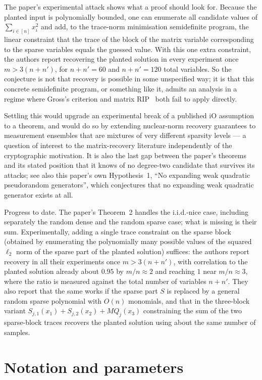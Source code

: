 \documentclass{aicr-conjecture}
\newcommand{\MQ}{\mathit{MQ}}
\begin{document}
The paper's experimental attack shows what a proof should look for.
Because the planted input is polynomially bounded, one can enumerate
all candidate values of $\sum_{i \in [n]} x_i^2$ and add, to the
trace-norm minimisation semidefinite program, the linear constraint
that the trace of the block of the matrix variable corresponding to the
sparse variables equals the guessed value. With this one extra
constraint, the authors report recovering the planted solution in every
experiment once $m > 3(n + n')$, for $n + n' = 60$ and $n + n' = 120$
total variables. So the conjecture is not that recovery is possible in
some unspecified way; it is that this concrete semidefinite program, or
something like it, admits an analysis in a regime where Gross's
criterion and matrix RIP~\cite{RFP, Recht} both fail to apply directly.

Settling this would upgrade an experimental break of a published iO
assumption to a theorem, and would do so by extending nuclear-norm
recovery guarantees to measurement ensembles that are mixtures of very
different sparsity levels --- a question of interest to the
matrix-recovery literature independently of the cryptographic
motivation. It is also the last gap between the paper's theorems and
its stated position that it knows of no degree-two candidate that
survives its attacks; see also this paper's own Hypothesis~1, ``No
expanding weak quadratic pseudorandom generators'', which conjectures
that no expanding weak quadratic generator exists at all.

Progress to date. The paper's Theorem~2 handles the i.i.d.-nice case,
including separately the random dense and the random sparse case; what
is missing is their sum. Experimentally, adding a single trace
constraint on the sparse block (obtained by enumerating the
polynomially many possible values of the squared $\ell_2$ norm of the
sparse part of the planted solution) suffices: the authors report
recovery in all their experiments once $m > 3(n + n')$, with
correlation to the planted solution already about $0.95$ by
$m/n \approx 2$ and reaching $1$ near $m/n \approx 3$, where the ratio
is measured against the total number of variables $n + n'$. They also
report that the same works if the sparse part $S$ is replaced by a
general random sparse polynomial with $O(n)$ monomials, and that in the
three-block variant $S_{j,1}(x_1) + S_{j,2}(x_2) + \MQ_j(x_3)$
constraining the sum of the two sparse-block traces recovers the
planted solution using about the same number of samples.

\section{Notation and parameters}\label{sec:notation}
\end{document}
